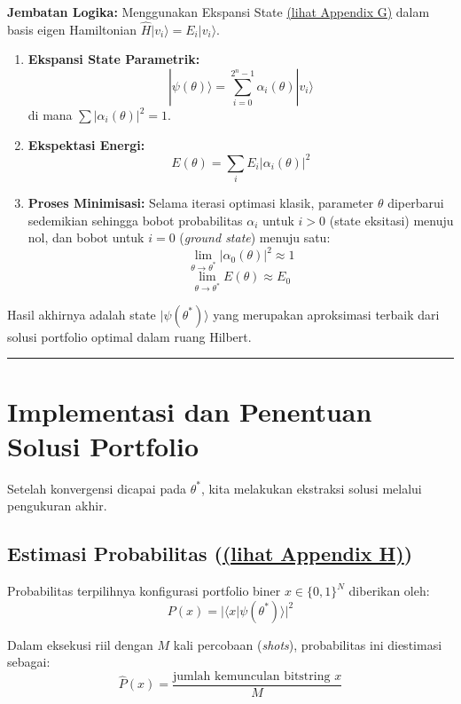 \documentclass[12pt,a4paper]{article}
\begin{document}
\textbf{Jembatan Logika:} Menggunakan Ekspansi State \hyperref[appendix-g]{(lihat Appendix G)} dalam basis eigen Hamiltonian \(\hat{H} |v_i\rangle = E_i |v_i\rangle\).

\begin{enumerate}
\def\labelenumi{\arabic{enumi}.}
\item
  \textbf{Ekspansi State Parametrik:} \[ |\psi(\theta)\rangle = \sum_{i=0}^{2^n-1} \alpha_i(\theta) |v_i\rangle \] di mana \(\sum |\alpha_i(\theta)|^2 = 1\).
\item
  \textbf{Ekspektasi Energi:} \[ E(\theta) = \sum_i E_i |\alpha_i(\theta)|^2 \]
\item
  \textbf{Proses Minimisasi:} Selama iterasi optimasi klasik, parameter \(\theta\) diperbarui sedemikian sehingga bobot probabilitas \(\alpha_i\) untuk \(i > 0\) (state eksitasi) menuju nol, dan bobot untuk \(i=0\) (\emph{ground state}) menuju satu: \[ \lim_{\theta \to \theta^*} |\alpha_0(\theta)|^2 \approx 1 \] \[ \lim_{\theta \to \theta^*} E(\theta) \approx E_0 \]
\end{enumerate}

Hasil akhirnya adalah state \(|\psi(\theta^*)\rangle\) yang merupakan aproksimasi terbaik dari solusi portfolio optimal dalam ruang Hilbert.

\begin{center}\rule{0.5\linewidth}{0.5pt}\end{center}

\hypertarget{implementasi-dan-penentuan-solusi-portfolio}{%
\section{Implementasi dan Penentuan Solusi Portfolio}\label{implementasi-dan-penentuan-solusi-portfolio}}

Setelah konvergensi dicapai pada \(\theta^*\), kita melakukan ekstraksi solusi melalui pengukuran akhir.

\hypertarget{a.-estimasi-probabilitas-appendix-h}{%
\subsection{Estimasi Probabilitas (\hyperref[appendix-h]{(lihat Appendix H)})}\label{a.-estimasi-probabilitas-appendix-h}}

Probabilitas terpilihnya konfigurasi portfolio biner \(x \in \{0, 1\}^N\) diberikan oleh: \[ P(x) = |\langle x | \psi(\theta^*) \rangle|^2 \]

Dalam eksekusi riil dengan \(M\) kali percobaan (\emph{shots}), probabilitas ini diestimasi sebagai: \[ \hat{P}(x) = \frac{\text{jumlah kemunculan bitstring } x}{M} \]
\end{document}
